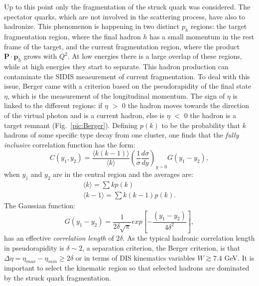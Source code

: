 Up to this point only the fragmentation of the struck quark was considered. The spectator quarks, which are not involved in the scattering process, have also to hadronize. This phenomenon is happening in two distinct $p_h$ regions: the target fragmentation region, where the final hadron $h$ has a small momentum in the rest frame of the target, and the current fragmentation region, where the product $\textbf{P}\cdot\textbf{p}_h$ grows with $Q^2$. At low energies there is a large overlap of these regions, while at high energies they start to separate. This hadron production can contaminate the SIDIS measurement of current fragmentation. To deal with this issue, Berger \cite{BERGER} came with a criterion based on the pseudorapidity of the final state $\eta$, which is the measurement of the longitudinal momentum. The sign of $\eta$ is linked to the different regions: if $\eta$ $>$ $0$ the hadron moves towards the direction of the virtual photon and is a current hadron, else is $\eta$ $<$ $0$ the hadron is a target remnant (Fig.~\ref{pic:Berger}). Defining $p(k)$ to be the probability that $k$ hadrons of some specific type decay from one cluster, one finds that the \textit{fully inclusive} correlation function has the form:
%
\begin{equation}
  C(y_1,y_2) = \frac{\langle k(k-1) \rangle}{\langle k \rangle} \left(\frac{1}{\sigma}\frac{d\sigma}{dy}\right)_{y\sim 0} G(y_1-y_2),
\end{equation}
%
when $y_1$ and $y_2$ are in the central region and the averages are:
%
\begin{equation}
  \begin{split}
    \langle k \rangle = \sum kp(k) \\
    \langle k-1 \rangle = \sum k(k-1)p(k).
  \end{split}
\end{equation}
%
The Gaussian function:
%
\begin{equation}
  G(y_1-y_2) = \frac{1}{2\delta \sqrt{\pi}}exp\left[-\frac{\left(y_1-y_2\right)}{4\delta^2}\right],
\end{equation}
%
has an effective \textit{correlation length} of $2\delta$. As the typical hadronic correlation length in pseudorapidity is $\delta \sim 2$, a separation criterion, the Berger criterion, is that $\Delta\eta = \eta_{max}-\eta_{min} \geq 2\delta$ or in terms of DIS kinematics variables $W \gtrsim 7.4$ GeV. It is important to select the kinematic region so that selected hadrons are dominated by the struck quark fragmentation.

